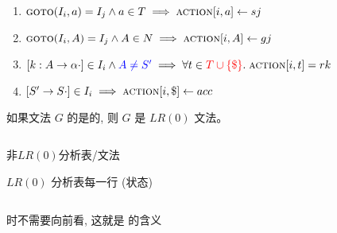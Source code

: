 \begin{frame}{}
  \begin{center}

    \vspace{0.60cm}
    \begin{enumerate}[(1)]
      \setlength{\itemsep}{25pt}
      \item $\textsc{goto}(I_{i}, a) = I_{j} \land a \in T \implies \textsc{action}[i, a] \gets sj$
      \item $\textsc{goto}(I_{i}, A) = I_{j} \land A \in N \implies \textsc{action}[i, A] \gets gj$
      \item $[k: A \to \alpha \cdot] \in I_{i} \land \textcolor{blue}{A \neq S'} \implies
        \forall t \in \textcolor{red}{T \cup \{\$\}}.\; \textsc{action}[i, t] = rk$
      \item $[S' \to S \cdot] \in I_{i} \implies \textsc{action}[i, \$] \gets acc$
    \end{enumerate}
  \end{center}
\end{frame}

\begin{frame}{}
  \begin{definition}[$LR(0)$文法]
    如果文法 $G$ 的是的,
    则 $G$ 是 $LR(0)$ 文法。
  \end{definition}

  \begin{center}
    \begin{columns}
        
    \end{columns}

    \vspace{0.20cm}
    非$LR(0)$分析表/文法
  \end{center}
\end{frame}

\begin{frame}{}
  \begin{center}
    $LR(0)$ 分析表每一行 (状态) 

    \begin{columns}
        
    \end{columns}

    \vspace{0.20cm}
    时不需要向前看, 这就是  的含义
  \end{center}
\end{frame}

